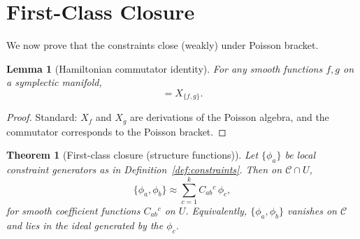\documentclass[11pt]{article}
\newtheorem{lemma}[definition]{Lemma}
\newtheorem{theorem}[definition]{Theorem}
\theoremstyle{remark}
\theoremstyle{plain}
\begin{document}
\section{First-Class Closure}

We now prove that the constraints close (weakly) under Poisson bracket.

\begin{lemma}[Hamiltonian commutator identity]
\label{lem:commutator}
For any smooth functions $f,g$ on a symplectic manifold,
\begin{equation}
[X_f,X_g] = X_{\{f,g\}}.
\end{equation}
\end{lemma}

\begin{proof}
Standard: $X_f$ and $X_g$ are derivations of the Poisson algebra, and the commutator corresponds to the Poisson bracket.
\end{proof}

\begin{theorem}[First-class closure (structure functions)]
\label{thm:firstclass}
Let $\{\phi_a\}$ be local constraint generators as in Definition~\ref{def:constraints}.
Then on $\mathcal{C}\cap U$,
\begin{equation}
\{\phi_a,\phi_b\}\approx \sum_{c=1}^k C_{ab}{}^{c}\,\phi_c,
\label{eq:firstclass}
\end{equation}
for smooth coefficient functions $C_{ab}{}^{c}$ on $U$.
Equivalently, $\{\phi_a,\phi_b\}$ vanishes on $\mathcal{C}$ and lies in the ideal generated by the $\phi_c$.
\end{theorem}
\end{document}
